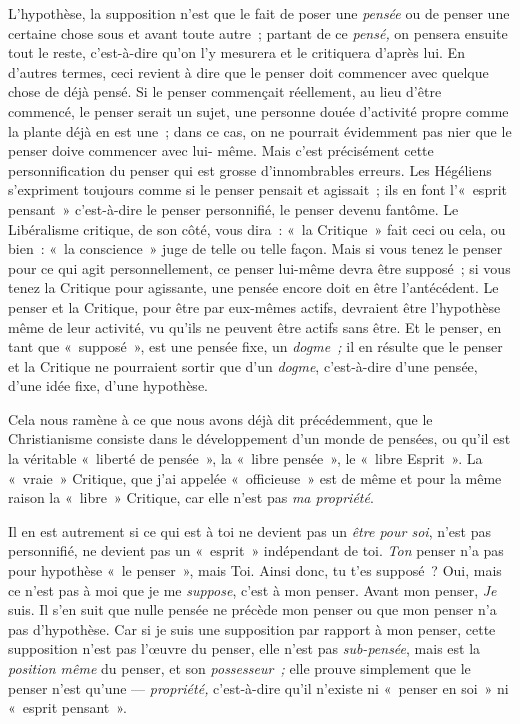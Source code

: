 \documentclass[french,twoside]{book} %
\begin{document}
L’hypothèse, la supposition n’est que le fait de poser une \emph{pensée} ou de penser une certaine chose sous et avant toute autre ; partant de ce \emph{pensé,} on pensera ensuite tout le reste, c’est-à-dire qu’on l’y mesurera et le critiquera d’après lui. En d’autres termes, ceci revient à dire que le penser doit commencer avec quelque chose de déjà pensé. Si le penser commençait réellement, au lieu d’être commencé, le penser serait un sujet, une personne douée d’activité propre comme la plante déjà en est une ; dans ce cas, on ne pourrait évidemment pas nier que le penser doive commencer avec lui- même. Mais c’est précisément cette personnification du penser qui est grosse d’innombrables erreurs. Les Hégéliens s’expriment toujours comme si le penser pensait et agissait ; ils en font l’« esprit pensant » c’est-à-dire le penser personnifié, le penser devenu fantôme. Le Libéralisme critique, de son côté, vous dira : « la Critique » fait ceci ou cela, ou bien : « la conscience » juge de telle ou telle façon. Mais si vous tenez le penser pour ce qui agit personnellement, ce penser lui-même devra être supposé ; si vous tenez la Critique pour agissante, une pensée encore doit en être l’antécédent. Le penser et la Critique, pour être par eux-mêmes actifs, devraient être l’hypothèse même de leur activité, vu qu’ils ne peuvent être actifs sans être. Et le penser, en tant que « supposé », est une pensée fixe, un \emph{dogme ;} il en résulte que le penser et la Critique ne pourraient sortir que d’un \emph{dogme}, c’est-à-dire d’une pensée, d’une idée fixe, d’une hypothèse.\par
Cela nous ramène à ce que nous avons déjà dit précédemment, que le Christianisme consiste dans le développement d’un monde de pensées, ou qu’il est la véritable « liberté de pensée », la « libre pensée », le « libre Esprit ». La « vraie » Critique, que j’ai appelée « officieuse » est de même et pour la même raison la « libre » Critique, car elle n’est pas \emph{ma propriété}.\par
Il en est autrement si ce qui est à toi ne devient pas un \emph{être pour soi}, n’est pas personnifié, ne devient pas un « esprit » indépendant de toi. \emph{Ton} penser n’a pas pour hypothèse « le penser », mais Toi. Ainsi donc, tu t’es supposé ? Oui, mais ce n’est pas à moi que je me \emph{suppose}, c’est à mon penser. Avant mon penser, \emph{Je} suis. Il s’en suit que nulle pensée ne précède mon penser ou que mon penser n’a pas d’hypothèse. Car si je suis une supposition par rapport à mon penser, cette supposition n’est pas l’œuvre du penser, elle n’est pas \emph{sub-pensée}, mais est la \emph{position  même} du penser, et son \emph{possesseur ;} elle prouve simplement que le penser n’est qu’une — \emph{propriété,} c’est-à-dire qu’il n’existe ni « penser en soi » ni « esprit pensant ».\par
\end{document}
